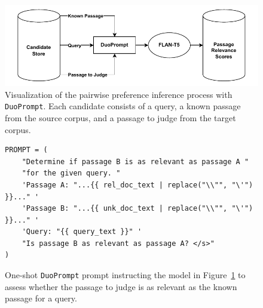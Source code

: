 \begin{figure}[t]
    \centering
    \includegraphics[width=\textwidth]{./graphics/drawio/pairwise_preferences.pdf}
    \caption{Visualization of the pairwise preference inference process with \texttt{DuoPrompt}. Each candidate consists of a query, a known passage from the source corpus, and a passage to judge from the target corpus.}
    \label{fig:pairwise-preferences}
\end{figure}

\begin{figure}[t]
    \centering
    \begin{tcolorbox}[title=DuoPrompt, width=\textwidth]
        \footnotesize
        \begin{verbatim}
PROMPT = (
    "Determine if passage B is as relevant as passage A "
    "for the given query. "
    'Passage A: "...{{ rel_doc_text | replace("\\"", "\'") }}..." '
    'Passage B: "...{{ unk_doc_text | replace("\\"", "\'") }}..." '
    'Query: "{{ query_text }}" '
    "Is passage B as relevant as passage A? </s>"
)
        \end{verbatim}
    \end{tcolorbox}
    \caption{One-shot \texttt{DuoPrompt} prompt instructing the model in Figure~\ref{fig:pairwise-preferences} to assess whether the passage to judge is as relevant as the known passage for a query.}
    \label{fig:oneshot-prompt}
\end{figure}

